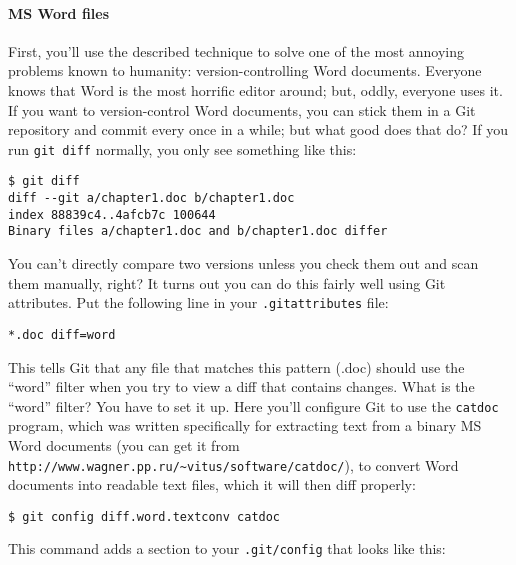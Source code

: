 \documentclass[a4paper]{book}
\begin{document}
\paragraph{MS Word files}

First, you'll use the described technique to solve one of the most annoying problems known to humanity: version-controlling Word documents. Everyone knows that Word is the most horrific editor around; but, oddly, everyone uses it. If you want to version-control Word documents, you can stick them in a Git repository and commit every once in a while; but what good does that do? If you run \texttt{git diff} normally, you only see something like this:

\begin{shaded}\begin{verbatim}
$ git diff
diff --git a/chapter1.doc b/chapter1.doc
index 88839c4..4afcb7c 100644
Binary files a/chapter1.doc and b/chapter1.doc differ
\end{verbatim}\end{shaded}

You can't directly compare two versions unless you check them out and scan them manually, right? It turns out you can do this fairly well using Git attributes. Put the following line in your \texttt{.gitattributes} file:

\begin{shaded}\begin{verbatim}
*.doc diff=word
\end{verbatim}\end{shaded}

This tells Git that any file that matches this pattern (.doc) should use the “word” filter when you try to view a diff that contains changes. What is the “word” filter? You have to set it up. Here you'll configure Git to use the \texttt{catdoc} program, which was written specifically for extracting text from a binary MS Word documents (you can get it from \texttt{http://www.wagner.pp.ru/\textasciitilde{}vitus/software/catdoc/}), to convert Word documents into readable text files, which it will then diff properly:

\begin{shaded}\begin{verbatim}
$ git config diff.word.textconv catdoc
\end{verbatim}\end{shaded}

This command adds a section to your \texttt{.git/config} that looks like this:
\end{document}
